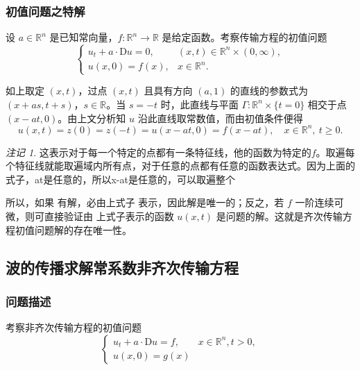 \documentclass[12pt,a4paper]{article}
\numberwithin{subsection}{section}
\numberwithin{subsubsection}{subsection}
\theoremstyle{plain}
\theoremstyle{definition}
\theoremstyle{remark}
\newtheorem{remark}[theorem]{注记}
\begin{document}
	\subsubsection{初值问题之特解} 
	设 $a \in \mathbb{R}^n$ 是已知常向量，$f: \mathbb{R}^n \rightarrow \mathbb{R}$ 是给定函数。考察传输方程的初值问题
	\begin{equation}
		\begin{cases}
			u_t + a \cdot \mathrm{D}u = 0, & (x, t) \in \mathbb{R}^n \times (0, \infty), \\
			u(x, 0) = f(x), & x \in \mathbb{R}^n.
		\end{cases}
	\end{equation}
	
	如上取定 $(x, t)$，过点 $(x, t)$ 且具有方向 $(a, 1)$ 的直线的参数式为 $(x + a s, t + s)$，$s \in \mathbb{R}$。当 $s = -t$ 时，此直线与平面 $\Gamma: \mathbb{R}^n \times \{t = 0\}$ 相交于点 $(x - a t, 0)$。由上文分析知 $u$ 沿此直线取常数值，而由初值条件便得
	\begin{equation}\label{eq:齐次解}
	u(x,t)=	z(0)=z(-t) =u(x - a t, 0) = f(x - a t), \quad x \in \mathbb{R}^n, \ t \geq 0.
	\end{equation}
	
	\begin{remark}
	这表示对于每一个特定的点都有一条特征线，他的函数为特定的$f$。取遍每个特征线就能取遍域内所有点，对于任意的点都有任意的函数表达式。因为上面的式子，at是任意的，所以x-at是任意的，可以取遍整个
	\end{remark}
		
	所以，如果 有解，必由上式子 表示，因此解是唯一的；反之，若 $f$ 一阶连续可微，则可直接验证由 上式子表示的函数 $u(x, t)$ 是问题的解。这就是齐次传输方程初值问题解的存在唯一性。
	
\subsection{波的传播求解常系数非齐次传输方程} 
\subsubsection{问题描述}
	考察非齐次传输方程的初值问题
	\begin{equation}
		\begin{cases}
			u_t + a \cdot \mathrm{D}u = f, & x \in \mathbb{R}^n, t > 0, \\
			u(x,0) = g(x)
		\end{cases}
	\end{equation}
	
\end{document}
